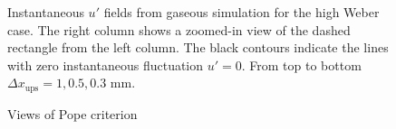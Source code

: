 \clearpage

\begin{figure}[ht]
\centering
{}
\caption[Instantaneous $u'$ fields from gaseous simulation for the high Weber case]{Instantaneous $u'$ fields from gaseous simulation for the high Weber case. The right column shows a zoomed-in view of the dashed rectangle from the left column. The black contours indicate the lines with zero instantaneous fluctuation $u' = 0$. From top to bottom $\Delta x_\mathrm{ups} = 1, 0.5, 0.3$ mm.}
\label{fig:ics_mesh_independency_study_up_fields}
\end{figure}

\begin{figure}[ht]
\centering
{}
\caption[]{Views of Pope criterion}
\label{fig:ics_mesh_independency_study_POPE_M_fields}
\end{figure}



